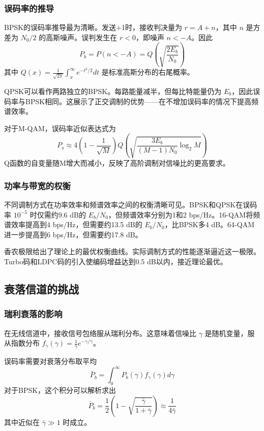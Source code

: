 \subsubsection{误码率的推导}

BPSK的误码率推导最为清晰。发送+1时，接收判决量为 $r = A + n$，其中 $n$ 是方差为 $N_0/2$ 的高斯噪声。误判发生在 $r < 0$，即噪声 $n < -A$。因此
\begin{equation}
    P_b = P(n < -A) = Q\left(\sqrt{\frac{2E_b}{N_0}}\right)
\end{equation}
其中 $Q(x) = \frac{1}{\sqrt{2\pi}} \int_x^\infty e^{-t^2/2} dt$ 是标准高斯分布的右尾概率。

QPSK可以看作两路独立的BPSK。每路能量减半，但每比特能量仍为 $E_b$，因此误码率与BPSK相同。这展示了正交调制的优势——在不增加误码率的情况下提高频谱效率。

对于M-QAM，误码率近似表达式为
\begin{equation}
    P_s \approx 4\left(1-\frac{1}{\sqrt{M}}\right) Q\left(\sqrt{\frac{3E_b}{(M-1)N_0}\log_2 M}\right)
\end{equation}
Q函数的自变量随M增大而减小，反映了高阶调制对信噪比的更高要求。

\subsubsection{功率与带宽的权衡}

不同调制方式在功率效率和频谱效率之间的权衡清晰可见。BPSK和QPSK在误码率 $10^{-5}$ 时仅需约9.6 dB的 $E_b/N_0$，但频谱效率分别为1和2 bps/Hz。16-QAM将频谱效率提高到4 bps/Hz，但需要约13.5 dB的 $E_b/N_0$，比BPSK多4 dB。64-QAM进一步提高到6 bps/Hz，但需要约17.8 dB。

香农极限给出了理论上的最优权衡曲线。实际调制方式的性能逐渐逼近这一极限。Turbo码和LDPC码的引入使编码增益达到0.5 dB以内，接近理论最优。

\subsection{衰落信道的挑战}

\subsubsection{瑞利衰落的影响}

在无线信道中，接收信号包络服从瑞利分布。这意味着信噪比 $\gamma$ 是随机变量，服从指数分布 $f_\gamma(\gamma) = \frac{1}{\bar{\gamma}} e^{-\gamma/\bar{\gamma}}$。

误码率需要对衰落分布取平均
\begin{equation}
    \bar{P}_b = \int_0^\infty P_b(\gamma) f_\gamma(\gamma) d\gamma
\end{equation}
对于BPSK，这个积分可以解析求出
\begin{equation}
    \bar{P}_b = \frac{1}{2}\left(1 - \sqrt{\frac{\bar{\gamma}}{1+\bar{\gamma}}}\right) \approx \frac{1}{4\bar{\gamma}}
\end{equation}
其中近似在 $\bar{\gamma} \gg 1$ 时成立。

